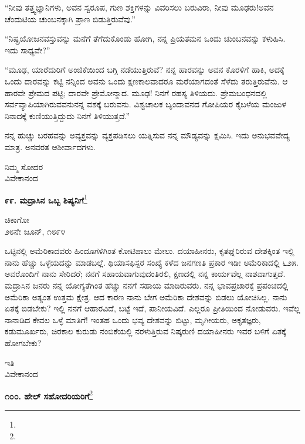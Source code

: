 “ನೀವು ತತ್ತ್ವಜ್ಞಾನಿಗಳು, ಅವನ ಸ್ವರೂಪ, ಗುಣ ಶಕ್ತಿಗಳನ್ನು ವಿವರಿಸಲು ಬರುವಿರಾ, ನೀವು ಮೂಢರು!ಅವನ ಚೆಂದುಟಿಯ ಚುಂಬನಕ್ಕಾಗಿ ಪ್ರಾಣ ಬಿಡುತ್ತಿರುವೆವು.”
\vspace{0.3cm}

“ನಿಷ್ಪ್ರಯೋಜನವಸ್ತುವನ್ನು ಮನೆಗೆ ತೆಗೆದುಕೊಂಡು ಹೋಗಿ, ನನ್ನ ಪ್ರಿಯತಮನ ಒಂದು ಚುಂಬನವನ್ನು ಕಳುಹಿಸಿ. ಇದು ಸಾಧ್ಯವೇ?”
\vspace{0.3cm}

“ಮೂಢ, ಯಾರೆದುರಿಗೆ ಅಂಜಿಕೆಯಿಂದ ಬಗ್ಗಿ ನಡೆಯುತ್ತಿರುವೆ? ನನ್ನ ಹಾರವನ್ನು ಅವನ ಕೊರಳಿಗೆ ಹಾಕಿ, ಅದಕ್ಕೆ ಒಂದು ದಾರವನ್ನು ಕಟ್ಟಿ ನನ್ನಿಂದ ಅವನು ಒಂದು ಕ್ಷಣಕಾಲವಾದರೂ ಮರೆಯಾಗದಂತೆ ಸೆಳೆದು ತರುತ್ತಿರುವೆನು. ಆ ಹಾರವೇ ಪ್ರೇಮದ ಪಟ್ಟಿ; ದಾರವೇ ಪ್ರೇಮೋನ್ಮಾದ. ಮೂಢ! ನಿನಗೆ ರಹಸ್ಯ ತಿಳಿಯದು. ಪ್ರೇಮಬಂಧನದಲ್ಲಿ ಸರ್ವವ್ಯಾಪಿಯಾಗಿರುವವನುನನ್ನ ವಶಕ್ಕೆ ಬರುವನು. ವಿಶ್ವಚಾಲಕ ಬೃಂದಾವನದ ಗೋಪಿಯರ ಕೈಬಳೆಯ ಮಂಜುಳ ನಿನಾದಕ್ಕೆ ಕುಣಿಯುತ್ತಿದ್ದುದು ನಿನಗೆ ತಿಳಿಯುತ್ತದೆ.”
\vspace{0.3cm}

ನನ್ನ ಹುಚ್ಚು ಬರಹವನ್ನು ಅವ್ಯಕ್ತವನ್ನು ವ್ಯಕ್ತಪಡಿಸಲು ಯತ್ನಿಸುವ ನನ್ನ ಮೌಡ್ಯವನ್ನು ಕ್ಷಮಿಸಿ. ಇದು ಅನುಭವವೇದ್ಯ ಮಾತ್ರ. ಅನವರತ ಆಶೀರ್ವಾದಗಳು.

{\flushright
ನಿಮ್ಮ ಸೋದರ\\ವಿವೇಕಾನಂದ\par}

\begin{center}
\textbf{೯೯. ಮದ್ರಾಸಿನ ಒಬ್ಬ ಶಿಷ್ಯನಿಗೆ}\footnote{}
\end{center}

\begin{flushright}
ಚಿಕಾಗೋ\\೨೮ನೇ ಜೂನ್, ೧೮೯೪
\end{flushright}

ಒಟ್ಟಿನಲ್ಲಿ ಅಮೆರಿಕಾದವರು ಹಿಂದೂಗಳಿಗಿಂತ ಕೋಟಿಪಾಲು ಮೇಲು. ದಯಾಹೀನರು, ಕೃತಘ್ನರಿರುವ ದೇಶಕ್ಕಿಂತ ಇಲ್ಲಿ ನಾನು ಹೆಚ್ಚು ಒಳ್ಳೆಯದನ್ನು ಮಾಡಬಲ್ಲೆ. ಥಿಯಾಸಫಿಸ್ಟರ ಸಂಖ್ಯೆ ಕಳೆದ ಜನಗಣತಿ ಪ್ರಕಾರ ಇಡೀ ಅಮೆರಿಕಾದಲ್ಲಿ ೬೨೫. ಅವರೊಂದಿಗೆ ನಾನು ಸೇರಿದರೆ; ನನಗೆ ಸಹಾಯವಾಗುವುದಂತಿರಲಿ, ಕ್ಷಣದಲ್ಲಿ ನನ್ನ ಕಾರ್ಯವೆಲ್ಲ ನಾಶವಾಗುತ್ತದೆ. ಮದ್ರಾಸಿನ ಜನರು ನನ್ನ ಯೋಗ್ಯತೆಗಿಂತ ಹೆಚ್ಚು ನನಗೆ ಸಹಾಯ ಮಾಡಿರುವರು. ನನ್ನ ಭಾವಪ್ರಚಾರಕ್ಕೆ ಪ್ರಪಂಚದಲ್ಲಿ ಅಮೆರಿಕಾ ಅತ್ಯಂತ ಉತ್ತಮ ಕ್ಷೇತ್ರ. ಆದ ಕಾರಣ ನಾನು ಬೇಗ ಅಮೆರಿಕಾ ದೇಶವನ್ನು ಬಿಡಲು ಯೋಚಿಸಿಲ್ಲ. ನಾನು ಏತಕ್ಕೆ ಬಿಡಬೇಕು? ಇಲ್ಲಿ ನನಗೆ ಆಹಾರವಿದೆ, ಬಟ್ಟೆ ಇದೆ, ಪಾನೀಯವಿದೆ. ಎಲ್ಲರೂ ಪ್ರೀತಿಯಿಂದ ನೋಡುವರು. ಇವೆಲ್ಲ ನಾನಾಡಿದ ಕೇವಲ ಒಳ್ಳೆ ಮಾತಿಗೆ! ಇಂತಹ ಒಂದು ಭವ್ಯ ದೇಶವನ್ನು ಬಿಟ್ಟು, ಮೃಗೀಯರು, ಅಕೃತಜ್ಞರು, ಕಡುಮೂರ್ಖರು, ಚಿರಕಾಲ ಕುರುಡು ನಂಬಿಕೆಯಲ್ಲಿ ನರಳುತ್ತಿರುವ ನಿಷ್ಕರುಣಿ ದಯಾಹೀನರು \enginline{-} ಇವರ ಬಳಿಗೆ ಏತಕ್ಕೆ ಹೋಗಬೇಕು?

{\flushright
ಇತಿ\\ವಿವೇಕಾನಂದ\par}

\begin{center}
\textbf{೧೦೦. ಹೇಲ್‌ ಸಹೋದರಿಯರಿಗೆ}\footnote{}
\end{center}

